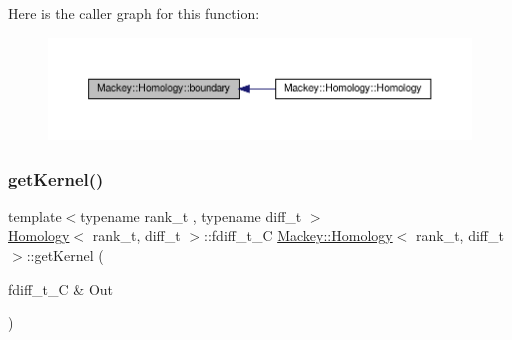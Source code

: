 Here is the caller graph for this function\+:\nopagebreak
\begin{figure}[H]
\begin{center}
\leavevmode
\includegraphics[width=350pt]{classMackey_1_1Homology_aeb3cbf5cc7cb166e8e0a552dda57d05b_icgraph}
\end{center}
\end{figure}
\mbox{\label{classMackey_1_1Homology_a72296e393c6f22a526375b0169daab94}} 
\subsubsection{\texorpdfstring{get\+Kernel()}{getKernel()}}
{\footnotesize\ttfamily template$<$typename rank\+\_\+t , typename diff\+\_\+t $>$ \\
\hyperlink{classMackey_1_1Homology}{Homology}$<$ rank\+\_\+t, diff\+\_\+t $>$\+::fdiff\+\_\+t\+\_\+C \hyperlink{classMackey_1_1Homology}{Mackey\+::\+Homology}$<$ rank\+\_\+t, diff\+\_\+t $>$\+::get\+Kernel (\begin{DoxyParamCaption}\item[{fdiff\+\_\+t\+\_\+C \&}]{Out }\end{DoxyParamCaption})}

